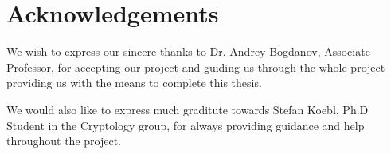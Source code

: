 \chapter{Acknowledgements}

We wish to express our sincere thanks to Dr. Andrey Bogdanov,
Associate Professor, for accepting our project and guiding us through
the whole project providing us with the means to complete this thesis.

We would also like to express much graditute towards Stefan Koebl,
Ph.D Student in the Cryptology group, for always providing guidance
and help throughout the project.


